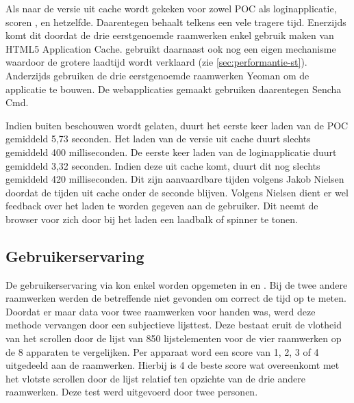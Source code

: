 Als naar de versie uit cache wordt gekeken voor zowel POC als loginapplicatie, scoren \kendo{}, \jqm{} en \lungo{} hetzelfde.
Daarentegen behaalt \st{} telkens een vele tragere tijd.
Enerzijds komt dit doordat de drie eerstgenoemde raamwerken enkel gebruik maken van HTML5 Application Cache.
\st{} gebruikt daarnaast ook nog een eigen mechanisme waardoor de grotere laadtijd wordt verklaard (zie \ref{sec:performantie-st}).
Anderzijds gebruiken de drie eerstgenoemde raamwerken Yeoman om de applicatie te bouwen.
De webapplicaties gemaakt \st{} gebruiken daarentegen Sencha Cmd.


Indien \st{} buiten beschouwen wordt gelaten, duurt het eerste keer laden van de POC gemiddeld 5,73 seconden. 
Het laden van de versie uit cache duurt slechts gemiddeld 400 milliseconden.
De eerste keer laden van de loginapplicatie duurt gemiddeld 3,32 seconden.
Indien deze uit cache komt, duurt dit nog slechts gemiddeld 420 milliseconden.
Dit zijn aanvaardbare tijden volgens Jakob Nielsen~\cite{Nielsen1993} doordat de tijden uit cache onder de seconde blijven.
Volgens Nielsen dient er wel feedback over het laden te worden gegeven aan de gebruiker.
Dit neemt de browser voor zich door bij het laden een laadbalk of spinner te tonen.


\subsection{Gebruikerservaring}
\label{sec:evaluatie-gebruikerservaring}
De gebruikerservaring via \js{} kon enkel worden opgemeten in \jqm{} en \kendo{}.
Bij de twee andere raamwerken werden de betreffende  niet gevonden om correct de tijd op te meten.
Doordat er maar data voor twee raamwerken voor handen was, werd deze methode vervangen door een subjectieve lijsttest.
Deze bestaat eruit de vlotheid van het scrollen door de lijst van 850 lijstelementen voor de vier raamwerken op de 8 apparaten te vergelijken.
Per apparaat word een score van 1, 2, 3 of 4 uitgedeeld aan de raamwerken.
Hierbij is 4 de beste score wat overeenkomt met het vlotste scrollen door de lijst relatief ten opzichte van de drie andere raamwerken.
Deze test werd uitgevoerd door twee personen.

